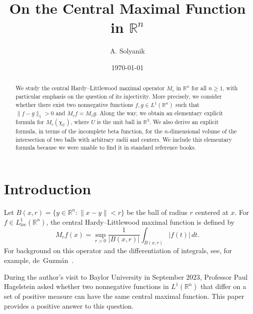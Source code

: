 \documentclass[12pt]{amsart}
\numberwithin{equation}{section}
\begin{document}
 
 \title{ On the Central Maximal Function in $\mathbb{R}^n$  }
 
\author{ A. Solyanik}

\date{\today}

\address{Odessa National Polytechnic University/Odessa/ Ukraine}

\newtheorem{remark}{Remark}
\newtheorem{theorem}{Theorem}
\newtheorem{lemma}{Lemma}
\newtheorem{lemma*}{Lemma*}
\newtheorem{proposition}{Proposition}
\newtheorem{corollary}{Corollary}
\newtheorem{example}{Example}
\maketitle
\begin{abstract}
We study the central Hardy--Littlewood maximal operator $M_c$ in
$\mathbb{R}^n$ for all $n\geq1$, with particular emphasis on the question
of its injectivity. More precisely, we consider whether there exist two
nonnegative functions $f,g\in L^1(\mathbb{R}^n)$ such that
$\|f-g\|_1>0$ and $M_cf=M_cg$.
Along the way, we obtain an elementary explicit formula for $M_c(\chi_U)$,
where $U$ is the unit ball in $\mathbb{R}^3$.
We also derive an explicit formula, in terms of the incomplete beta
function, for the $n$-dimensional volume of the intersection of two balls
with arbitrary radii and centers. We include this elementary formula
because we were unable to find it in standard reference books.
\end{abstract}

\section{Introduction}
Let $B(x, r) = \{y \in \mathbb{R}^n : \lVert x - y \rVert < r\}$ be the ball
of radius $r$ centered at $x$. For $f\in L^1_\text{loc}(\mathbb{R}^n)$, the
central Hardy--Littlewood maximal function is defined by
\[
M_cf(x)=\sup_{r>0} \frac{1}{\vert B(x, r) \vert}\int_{B(x,r)} \vert f(t) \vert\,dt.
\]
For background on this operator and the differentiation of integrals,
see, for example, de~Guzm\'an~\cite{deguzman1975}.

During the author's visit to Baylor University in September 2023,
Professor Paul Hagelstein asked whether two nonnegative functions in
$L^1(\mathbb{R}^n)$ that differ on a set of positive measure can have the
same central maximal function. This paper provides a positive answer to
this question.
\end{document}
